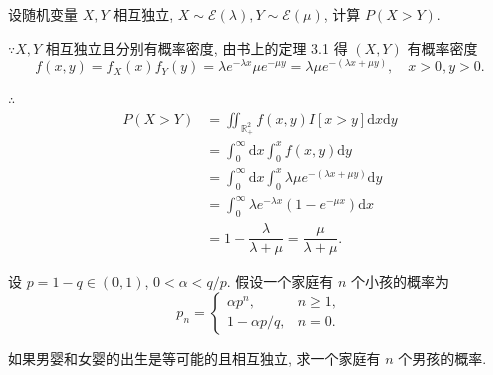 \documentclass[color=black,device=normal,lang=cn]{elegantnote}
\numberwithin{equation}{section}
\theoremstyle{plain}
\numberwithin{exercise}{exsection}
\begin{document}
\addtocounter{exercise}{2}
\begin{exercise}%
    设随机变量 $X,Y$ 相互独立, $X\sim\mathcal{E}(\lambda),Y\sim\mathcal{E}(\mu)$, 计算 $P(X>Y)$.
\end{exercise}
\begin{solution}
    $\because X,Y$ 相互独立且分别有概率密度, 由书上的定理 3.1 得 $(X,Y)$ 有概率密度
    \[f(x,y)=f_X(x)f_Y(y)=\lambda e^{-\lambda x}\mu e^{-\mu y}=\lambda\mu e^{-(\lambda x+\mu y)},\quad x>0,y>0.\]

    $\therefore$
    \begin{align*}
        P(X>Y) & =\iint_{\mathbb{R}_+^2}f(x,y)I[x>y]\mathrm{d}x\mathrm{d}y \\
        & =\int_0^\infty\mathrm{d}x\int_0^xf(x,y)\mathrm{d}y \\
        & =\int_0^\infty\mathrm{d}x\int_0^x\lambda\mu e^{-(\lambda x+\mu y)}\mathrm{d}y \\
        & =\int_0^\infty\lambda e^{-\lambda x}(1-e^{-\mu x})\mathrm{d}x \\
        & =1-\dfrac{\lambda}{\lambda+\mu}=\dfrac{\mu}{\lambda+\mu}.
    \end{align*}
\end{solution}
\begin{exercise}%
    设 $p=1-q\in(0,1)$, $0<\alpha<q/p$. 假设一个家庭有 $n$ 个小孩的概率为
    \[p_n=\begin{cases}
        \alpha p^n, & n\geq 1, \\
        1-\alpha p/q, & n=0.
    \end{cases}\]

    如果男婴和女婴的出生是等可能的且相互独立, 求一个家庭有 $n$ 个男孩的概率.
\end{exercise}
\end{document}
